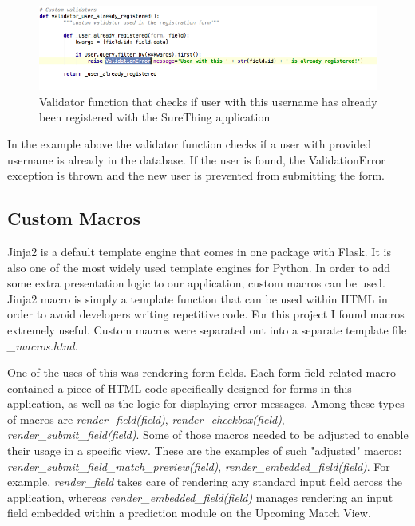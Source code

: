 \begin{figure}[H]
	\begin{center}
		\includegraphics[width=.90\textwidth]{impl/images/customValidator}
		\caption{Validator function that checks if user with this username has already been registered with the SureThing application} \label{fig:using:customValidator}
	\end{center}
\end{figure}

In the example above the validator function checks if a user with provided username is already in the database. If the user is found, the ValidationError exception is thrown and the new user is prevented from submitting the form.

\subsection{Custom Macros}
Jinja2 is a default template engine that comes in one package with Flask. It is also one of the most widely used template engines for Python. In order to add some extra presentation logic to our application, custom macros can be used. Jinja2 macro is simply a template function that can be used within HTML in order to avoid developers writing repetitive code. For this project I found macros extremely useful. Custom macros were separated out into a separate template file \emph{\_macros.html}.

One of the uses of this was rendering form fields. Each form field related macro contained a piece of HTML code specifically designed for forms in this application, as well as the logic for displaying error messages. Among these types of macros are \emph{render\_field(field)}, \emph{render\_checkbox(field)}, \emph{render\_submit\_field(field)}. Some of those macros needed to be adjusted to enable their usage in a specific view. These are the examples of such "adjusted" macros: \emph{render\_submit\_field\_match\_preview(field)}, \emph{render\_embedded\_field(field)}. For example, \emph{render\_field} takes care of rendering any standard input field across the application, whereas \emph{render\_embedded\_field(field)} manages rendering an input field embedded within a prediction module on the Upcoming Match View.

